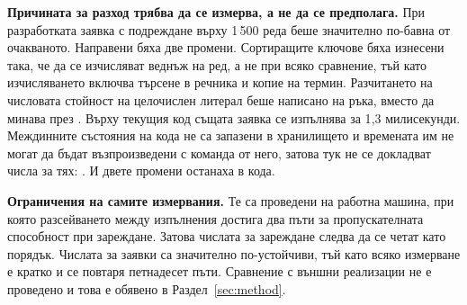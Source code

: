 \textbf{Причината за разход трябва да се измерва, а не да се предполага.} При разработката
заявка с подреждане върху 1\,500 реда беше значително по-бавна от очакваното. Направени бяха
две промени. Сортиращите ключове бяха изнесени така, че да се изчисляват веднъж на ред, а не
при всяко сравнение, тъй като изчисляването включва търсене в речника и копие на термин.
Разчитането на числовата стойност на целочислен литерал беше написано на ръка, вместо да
минава през . Върху текущия код същата заявка се изпълнява за 1{,}3
милисекунди. Междинните състояния на кода не са запазени в хранилището и времената им не
могат да бъдат възпроизведени с команда от него, затова тук не се докладват числа за тях:
. И двете промени останаха в кода.

\textbf{Ограничения на самите измервания.} Те са проведени на работна машина, при която
разсейването между изпълнения достига два пъти за пропускателната способност при зареждане.
Затова числата за зареждане следва да се четат като порядък. Числата за заявки са значително
по-устойчиви, тъй като всяко измерване е кратко и се повтаря петнадесет пъти. Сравнение с
външни реализации не е проведено и това е обявено в Раздел~\ref{sec:method}.

